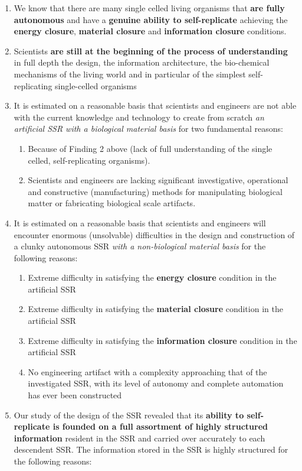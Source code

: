 \begin{enumerate}
\item We know that there are many single celled living organisms that
\textbf{are fully autonomous} and have a \textbf{genuine ability to
self-replicate} achieving the \textbf{energy closure}, \textbf{material
closure} and \textbf{information closure} conditions.
\item Scientists \textbf{are still at the beginning of the process of
understanding} in full depth the design, the information architecture,
the bio-chemical mechanisms of the living world and in particular of
the simplest self-replicating single-celled organisms
\item It is estimated on a reasonable basis that scientists and
engineers are not able with the current knowledge and technology to
create from scratch \textit{an artificial SSR with a biological
material basis} for two fundamental reasons:

\begin{enumerate}
\item Because of Finding 2 above (lack of full understanding of the
single celled, self-replicating organisms).
\item Scientists and engineers are lacking significant investigative,
operational and constructive (manufacturing) methods for manipulating
biological matter or fabricating biological scale artifacts.
\end{enumerate}
\item It is estimated on a reasonable basis that scientists and
engineers will encounter enormous (unsolvable) difficulties in the
design and construction of a clunky autonomous SSR \textit{with a
non-biological material basis} for the following reasons:

\begin{enumerate}
\item Extreme difficulty in satisfying the \textbf{energy closure}
condition in the artificial SSR 
\item Extreme difficulty in satisfying the \textbf{material closure}
condition in the artificial SSR 
\item Extreme difficulty in satisfying the \textbf{information closure}
condition in the artificial SSR
\item No engineering artifact with a complexity approaching that of the
investigated SSR, with its level of autonomy and complete automation
has ever been constructed
\end{enumerate}
\item Our study of the design of the SSR revealed that its
\textbf{ability to self-replicate is founded on a full assortment of
highly structured information} resident in the SSR and carried over
accurately to each descendent SSR.  The information stored in the SSR
is highly structured for the following reasons:


\end{enumerate}
